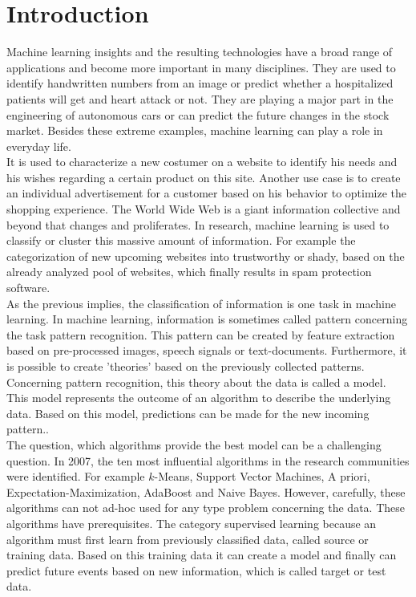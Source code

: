 \chapter{Introduction}
Machine learning insights and the resulting technologies have a broad range of applications and become more important in many disciplines.
They are used to identify handwritten numbers from an image or predict whether a hospitalized patients will get and heart attack or not. 
They are playing a major part in the engineering of autonomous cars or can predict the future changes in the stock market.
Besides these extreme examples, machine learning can play a role in everyday life.\\
It is used to characterize a new costumer on a website to identify his needs and his wishes regarding a certain product on this site.
Another use case is to create an individual advertisement for a customer based on his behavior to optimize the shopping experience.
The World Wide Web is a giant information collective and beyond that changes and proliferates.
In research, machine learning is used to classify or cluster this massive amount of information.
For example the categorization of new upcoming websites into trustworthy or shady, based on the already analyzed pool of websites, which finally results in spam protection software.\\
As the previous implies, the classification of information is one task in machine learning.
In machine learning, information is sometimes called pattern concerning the task pattern recognition.
This pattern can be created by feature extraction based on pre-processed images, speech signals or text-documents.
Furthermore, it is possible to create 'theories' based on the previously collected patterns.
Concerning pattern recognition, this theory about the data is called a model. 
This model represents the outcome of an algorithm to describe the underlying data.
Based on this model, predictions can be made for the new incoming pattern..\\
The question, which algorithms provide the best model can be a challenging question.
In 2007, the ten most influential algorithms in the research communities were identified.
For example $k$-Means, Support Vector Machines, A priori, Expectation-Maximization, AdaBoost and Naive Bayes.
However, carefully, these algorithms can not ad-hoc used for any type problem concerning the data.
These algorithms have prerequisites.
The category supervised learning because an algorithm must first learn from previously classified data, called source or training data. Based on this training data it can create a model and finally can predict future events based on new information, which is called target or test data.
